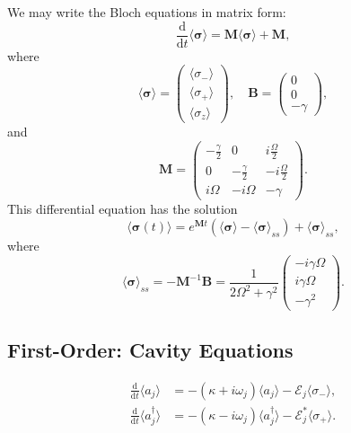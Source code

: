 \documentclass{article}
\newcommand{\ddt}[1][]{\frac{\mathrm{d} #1}{\mathrm{d}t}}
\begin{document}
We may write the Bloch equations in matrix form:
\begin{equation}
	\ddt \langle \bm{\sigma} \rangle = \bm{M} \langle \bm{\sigma} \rangle + \bm{M},
\end{equation}
where
\begin{equation}
	\langle \bm{\sigma} \rangle = 
	\begin{pmatrix}
		\langle \sigma_{-} \rangle \\
		\langle \sigma_{+} \rangle \\
		\langle \sigma_{z} \rangle
	\end{pmatrix}
	, \quad \bm{B} = 
	\begin{pmatrix}
		0 \\
		0 \\
		- \gamma
	\end{pmatrix},
\end{equation}
and
\begin{equation}
	\bm{M} = 
	\begin{pmatrix}
		-\frac{\gamma}{2} & 0 & i \frac{\Omega}{2} \\
		0 & -\frac{\gamma}{2} & -i \frac{\Omega}{2} \\
		i \Omega & -i \Omega & -\gamma
	\end{pmatrix}.
\end{equation}
This differential equation has the solution
\begin{equation}
	\langle \bm{\sigma}(t) \rangle = e^{\bm{M} t} \left( \langle \bm{\sigma} \rangle - \langle \bm{\sigma} \rangle_{ss} \right) + \langle \bm{\sigma} \rangle_{ss},
\end{equation}
where
\begin{equation}
	\langle \bm{\sigma} \rangle_{ss} = -\bm{M}^{-1} \bm{B} = \frac{1}{2\Omega^{2} + \gamma^{2}}
	\begin{pmatrix}
		-i \gamma \Omega \\
		i \gamma \Omega \\
		-\gamma^{2}
	\end{pmatrix}.
\end{equation}

\subsection{First-Order: Cavity Equations}

\begin{subequations}
	\begin{align}
		\ddt \langle a_{j} \rangle &= -\left( \kappa + i \omega_{j} \right) \langle a_{j} \rangle - \mathcal{E}_{j} \langle \sigma_{-} \rangle, \\
		\ddt \langle a^{\dagger}_{j} \rangle &= -\left( \kappa - i \omega_{j} \right) \langle a^{\dagger}_{j} \rangle - \mathcal{E}_{j}^{*} \langle \sigma_{+} \rangle.
	\end{align}
\end{subequations}
\end{document}
